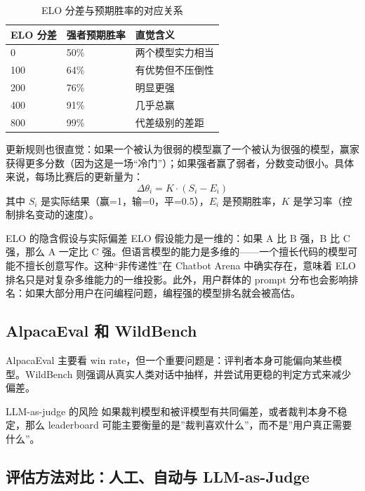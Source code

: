 \begin{table}[H]
\centering
\begin{tabular}{p{3.0cm}p{4.0cm}p{5.5cm}}
\toprule
\textbf{ELO 分差} & \textbf{强者预期胜率} & \textbf{直觉含义} \\
\midrule
0 & 50\% & 两个模型实力相当 \\
100 & 64\% & 有优势但不压倒性 \\
200 & 76\% & 明显更强 \\
400 & 91\% & 几乎总赢 \\
800 & 99\% & 代差级别的差距 \\
\bottomrule
\end{tabular}
\caption{ELO 分差与预期胜率的对应关系}
\end{table}

更新规则也很直觉：如果一个被认为很弱的模型赢了一个被认为很强的模型，赢家获得更多分数（因为这是一场``冷门''）；如果强者赢了弱者，分数变动很小。具体来说，每场比赛后的更新量为：
\[
\Delta\theta_i = K \cdot (S_i - E_i)
\]
其中 $S_i$ 是实际结果（赢=1，输=0，平=0.5），$E_i$ 是预期胜率，$K$ 是学习率（控制排名变动的速度）。

\begin{warningbox}{ELO 的隐含假设与实际偏差}
ELO 假设能力是一维的：如果 A 比 B 强，B 比 C 强，那么 A 一定比 C 强。但语言模型的能力是多维的——一个擅长代码的模型可能不擅长创意写作。这种``非传递性''在 Chatbot Arena 中确实存在，意味着 ELO 排名只是对复杂多维能力的一维投影。此外，用户群体的 prompt 分布也会影响排名：如果大部分用户在问编程问题，编程强的模型排名就会被高估。
\end{warningbox}

\subsection{AlpacaEval 和 WildBench}

AlpacaEval 主要看 win rate，但一个重要问题是：评判者本身可能偏向某些模型。WildBench 则强调从真实人类对话中抽样，并尝试用更稳的判定方式来减少偏差。

\begin{warningbox}{LLM-as-judge 的风险}
如果裁判模型和被评模型有共同偏差，或者裁判本身不稳定，那么 leaderboard 可能主要衡量的是”裁判喜欢什么”，而不是”用户真正需要什么”。
\end{warningbox}

\subsection{评估方法对比：人工、自动与 LLM-as-Judge}

